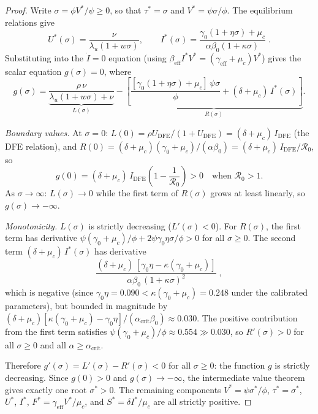\documentclass[11pt]{article}
\begin{document}
\begin{proof}
Write $\sigma = \phi V^*/\psi \geq 0$, so that $\tau^* = \sigma$ and $V^* = \psi\sigma/\phi$. The equilibrium relations give
\[
U^*(\sigma) = \frac{\nu}{\lambda_u(1+w\sigma)}, \qquad
I^*(\sigma) = \frac{\gamma_0(1+\eta\sigma)+\mu_c}{\alpha\beta_0(1+\kappa\sigma)}\;.
\]
Substituting into the $\dot{I} = 0$ equation (using $\beta_{\mathrm{eff}} I^* V^* = (\gamma_{\mathrm{eff}}+\mu_c)V^*$) gives the scalar equation $g(\sigma) = 0$, where
\[
g(\sigma) = \underbrace{\frac{\rho\,\nu}{\lambda_u(1{+}w\sigma)+\nu}}_{\displaystyle L(\sigma)} - \underbrace{\left[\frac{[\gamma_0(1{+}\eta\sigma)+\mu_c]\,\psi\sigma}{\phi} + (\delta{+}\mu_c)\,I^*(\sigma)\right]}_{\displaystyle R(\sigma)}.
\]

\emph{Boundary values.}
At $\sigma = 0$: $L(0) = \rho U_{\mathrm{DFE}}/(1{+}U_{\mathrm{DFE}}) = (\delta{+}\mu_c)\,I_{\mathrm{DFE}}$ (the DFE relation), and $R(0) = (\delta{+}\mu_c)(\gamma_0{+}\mu_c)/(\alpha\beta_0) = (\delta{+}\mu_c)\,I_{\mathrm{DFE}}/\mathcal{R}_0$, so
\[
g(0) = (\delta{+}\mu_c)\,I_{\mathrm{DFE}}\!\left(1 - \frac{1}{\mathcal{R}_0}\right) > 0 \quad\text{when } \mathcal{R}_0 > 1.
\]
As $\sigma \to \infty$: $L(\sigma) \to 0$ while the first term of $R(\sigma)$ grows at least linearly, so $g(\sigma) \to -\infty$.

\emph{Monotonicity.}
$L(\sigma)$ is strictly decreasing ($L'(\sigma) < 0$).
For $R(\sigma)$, the first term has derivative $\psi(\gamma_0{+}\mu_c)/\phi + 2\psi\gamma_0\eta\sigma/\phi > 0$ for all $\sigma \geq 0$. The second term $(\delta{+}\mu_c)\,I^*(\sigma)$ has derivative
\[
\frac{(\delta{+}\mu_c)\,[\gamma_0\eta - \kappa(\gamma_0{+}\mu_c)]}{\alpha\beta_0\,(1{+}\kappa\sigma)^2}\;,
\]
which is negative (since $\gamma_0\eta = 0.090 < \kappa(\gamma_0{+}\mu_c) = 0.248$ under the calibrated parameters), but bounded in magnitude by $(\delta{+}\mu_c)[\kappa(\gamma_0{+}\mu_c)-\gamma_0\eta]/(\alpha_{\mathrm{crit}}\beta_0) \approx 0.030$. The positive contribution from the first term satisfies $\psi(\gamma_0{+}\mu_c)/\phi \approx 0.554 \gg 0.030$, so $R'(\sigma) > 0$ for all $\sigma \geq 0$ and all $\alpha \geq \alpha_{\mathrm{crit}}$.

Therefore $g'(\sigma) = L'(\sigma) - R'(\sigma) < 0$ for all $\sigma \geq 0$: the function $g$ is strictly decreasing. Since $g(0) > 0$ and $g(\sigma) \to -\infty$, the intermediate value theorem gives exactly one root $\sigma^* > 0$. The remaining components $V^* = \psi\sigma^*/\phi$, $\tau^* = \sigma^*$, $U^*$, $I^*$, $F^* = \gamma_{\mathrm{eff}} V^*/\mu_c$, and $S^* = \delta I^*/\mu_c$ are all strictly positive.
\end{proof}
\end{document}
